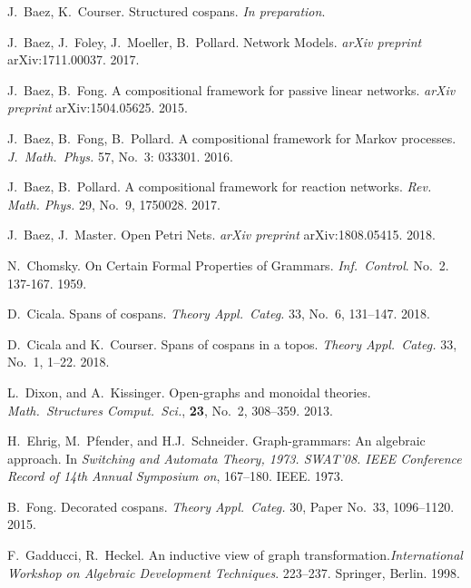 \documentclass{amsart}
\theoremstyle{remark}
\theoremstyle{definition}
\begin{document}
% 
% 

\begin{thebibliography}{99}

 J.~Baez, K.~Courser. Structured cospans. \emph{In preparation}.

 J.~Baez, J.~Foley, J.~Moeller, B.~Pollard. Network
  Models. \emph{arXiv preprint} arXiv:1711.00037. 2017.
  
 J.~Baez, B.~Fong. A compositional framework for passive linear networks. \emph{arXiv preprint} arXiv:1504.05625. 2015.

 J.~Baez, B.~Fong, B.~Pollard. A compositional
  framework for Markov processes. \emph{J.~Math.~Phys.} 57, No.~3:
  033301. 2016.
  
 J.~Baez, B.~Pollard. A compositional framework for
  reaction networks. \emph{Rev. Math. Phys.} 29, No.~9, 1750028. 2017.

 J.~Baez, J.~Master. Open Petri Nets. \emph{arXiv preprint} arXiv:1808.05415. 2018.
  
 N.~Chomsky. On Certain Formal Properties of Grammars.
\emph{Inf.~Control}. No.~2. 137-167. 1959. 
  
 D.\ Cicala. Spans of cospans. \emph{Theory Appl.\
    Categ.} 33, No.\ 6, 131--147. 2018.

 D.\ Cicala and K.\ Courser. Spans of
  cospans in a topos. \emph{Theory Appl.\ Categ.} 33, No.\ 1,
  1--22. 2018.

 L.\ Dixon, and A.\ Kissinger. Open-graphs
  and monoidal theories. \emph{Math.\ Structures Comput.\ Sci.},
  \textbf{23}, No.\ 2, 308--359. 2013.

 H.\ Ehrig, M.\ Pfender, and H.J.\
  Schneider. Graph-grammars: An algebraic approach. In \emph{Switching
    and Automata Theory, 1973. SWAT'08. IEEE Conference Record of 14th
    Annual Symposium on}, 167--180. IEEE. 1973.
  
 B.\ Fong. Decorated cospans. \emph{Theory
    Appl.\ Categ.} 30, Paper No.\ 33, 1096--1120. 2015.
          
\bibitem{Gadd_IndGraphTrans} F.\ Gadducci, R.\ Heckel. An inductive
  view of graph transformation.\emph{International Workshop on
    Algebraic Development Techniques}. 223--237. Springer, Berlin. 1998.


\end{thebibliography}
\end{document}

